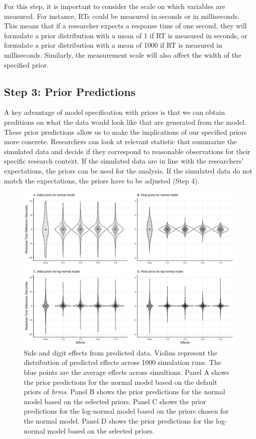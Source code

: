\documentclass[
  english,
  doc,floatsintext]{apa6}
\begin{document}
For this step, it is important to consider the scale on which variables are measured. For instance, RTs could be measured in seconds or in milliseconds. This means that if a researcher expects a response time of one second, they will formulate a prior distribution with a mean of 1 if RT is measured in seconds, or formulate a prior distribution with a mean of 1000 if RT is measured in milliseconds. Similarly, the measurement scale will also affect the width of the specified prior.

\hypertarget{step-3-prior-predictions}{%
\subsection{Step 3: Prior Predictions}\label{step-3-prior-predictions}}

A key advantage of model specification with priors is that we can obtain preditions on what the data would look like that are generated from the model. These prior predictions allow us to make the implications of our specified priors more concrete. Researchers can look at relevant statistic that summarize the simulated data and decide if they correspond to reasonable observations for their specific research context. If the simulated data are in line with the researchers' expectations, the priors can be used for the analysis. If the simulated data do not match the expectations, the priors have to be adjusted (Step 4).

\begin{figure}[H]

\includegraphics[width=1\linewidth]{Images/Fig5_priorpredfigure_v2} \hfill{}

\caption{Side and digit effects from predicted data. Violins represent the distribution of predicted effects across 1000 simulation runs. The blue points are the average effects across simultions. Panel A shows the prior predictions for the normal model based on the default priors of \textit{brms}. Panel B shows the prior predictions for the normal model based on the selected priors. Panel C shows the prior predictions for the log-normal model based on the priors chosen for the normal model. Panel D shows the prior predictions for the log-normal model based on the selected priors.}\label{fig:priorpredfigurepanel}
\end{figure}
\end{document}
